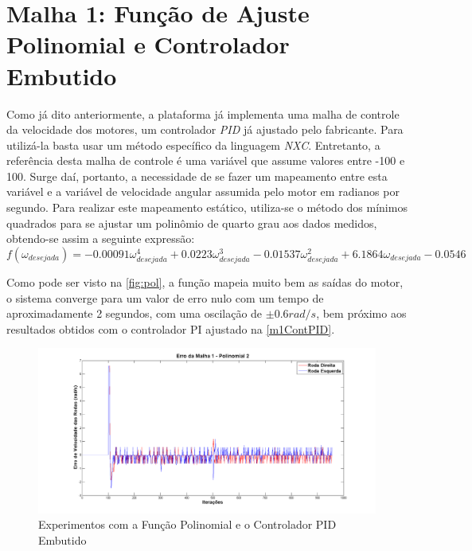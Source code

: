 \section{Malha 1: Função de Ajuste Polinomial e Controlador Embutido}
\label{m1ContPol}
Como já dito anteriormente, a plataforma já implementa uma malha de controle da velocidade dos motores, um controlador \emph{PID} já ajustado pelo fabricante. Para utilizá-la basta usar um método específico da linguagem \emph{NXC}. Entretanto, a referência desta malha de controle é uma variável que assume valores entre -100 e 100. Surge daí, portanto, a necessidade de se fazer um mapeamento entre esta variável e a variável de velocidade angular assumida pelo motor em radianos por segundo. Para realizar este mapeamento estático, utiliza-se o método dos mínimos quadrados para se ajustar um polinômio de quarto grau aos dados medidos, obtendo-se assim a seguinte expressão:%
\begin{equation}
f(\omega_{desejada}) = -0.00091\omega_{desejada}^{4} + 0.0223\omega_{desejada}^{3} - 0.01537\omega_{desejada}^{2} + 6.1864\omega_{desejada} - 0.0546
\label{eq:pol}
\end{equation} 
 
 Como pode ser visto na \autoref{fig:pol}, a função mapeia muito bem as saídas do motor, o sistema converge para um valor de erro nulo com um tempo de aproximadamente 2 segundos, com uma oscilação de $\pm0.6 rad/s$, bem próximo aos resultados obtidos com o controlador PI ajustado na \autoref{m1ContPID}. %
 
 \begin{figure}[!htb]
 	\centering
	\includegraphics[width=.9\linewidth]{./Testes/Malha1/Polinomial/Polinomial}
 	\caption{Experimentos com a Função Polinomial e o Controlador PID Embutido}
 	\label{fig:pol}
 \end{figure}
 
